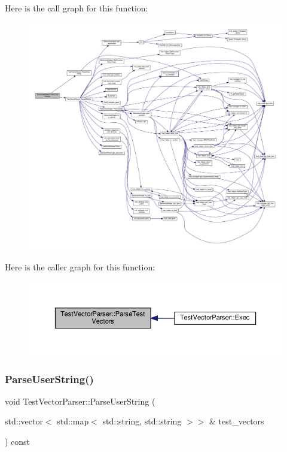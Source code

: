Here is the call graph for this function\+:
\nopagebreak
\begin{figure}[H]
\begin{center}
\leavevmode
\includegraphics[width=350pt]{d8/d4e/classTestVectorParser_aee7869de887840eda1288d87a1e19a7b_cgraph}
\end{center}
\end{figure}
Here is the caller graph for this function\+:
\nopagebreak
\begin{figure}[H]
\begin{center}
\leavevmode
\includegraphics[width=350pt]{d8/d4e/classTestVectorParser_aee7869de887840eda1288d87a1e19a7b_icgraph}
\end{center}
\end{figure}
\mbox{\label{classTestVectorParser_a92e072b1028880a427b199a32b020f23}} 
\subsubsection{\texorpdfstring{Parse\+User\+String()}{ParseUserString()}}
{\footnotesize\ttfamily void Test\+Vector\+Parser\+::\+Parse\+User\+String (\begin{DoxyParamCaption}\item[{std\+::vector$<$ std\+::map$<$ std\+::string, std\+::string $>$$>$ \&}]{test\+\_\+vectors }\end{DoxyParamCaption}) const\hspace{0.3cm}{\ttfamily [private]}}



